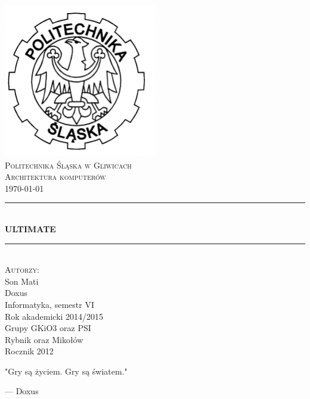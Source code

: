 \documentclass[a4paper,twoside]{article}
\newcommand{\HRule}{\rule{\linewidth}{0.5mm}}
\begin{document}





\begin{titlepage}
	\begin{center}
		
		\includegraphics[width=0.5\textwidth]{./images/logo.png}~\\[1cm]
		
		\textsc{\LARGE Politechnika Śląska w Gliwicach}\\[1.5cm]
		
		\textsc{\Large Architektura komputerów}\\
		\textsc{\today}\\[0.5cm]
		
		\HRule \\[0.4cm]
		{ \huge \bfseries ULTIMATE  \\[0.4cm] }
		
		\HRule \\[1.2cm]
		
		\textsc{\Large Autorzy:} \\
		{\large Son Mati} \\
		{\large Doxus}\\[0.8cm]
		
		Informatyka, semestr VI \\
		Rok akademicki 2014/2015 \\
		Grupy GKiO3 oraz PSI \\
		Rybnik oraz Mikołów \\
		Rocznik 2012\\[1.2cm]
		\epigraph{
			"Gry są życiem. Gry są światem."
		}{
		--- Doxus}
		\vfill
		
	\end{center}
\end{titlepage}

{\hypersetup{hidelinks}
	\tableofcontents
}








	
\end{document}
